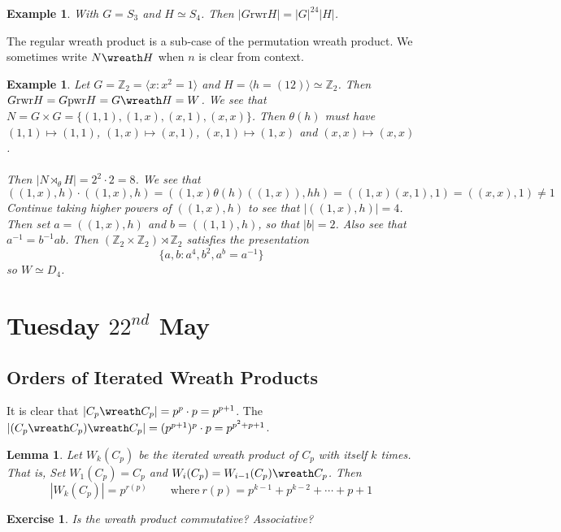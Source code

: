 \documentclass[a4paper,10pt]{article}
\newcommand{\ZZ}{\mathbb{Z}}
\newtheorem{eg}[thm]{Example}
\newtheorem{Ex}[thm]{Exercise}
\newtheorem{Lem}[thm]{Lemma}
\begin{document}
\begin{eg}
With $G = S_3$ and $H \simeq S_4$. Then $|G \text{rwr} H | = |G|^{24} |H|$. 
\end{eg}


The regular wreath product is a sub-case of the permutation wreath product. We sometimes write $N \wreath H$ when $n$ is clear from context. 

\begin{eg}
Let $G = \ZZ_2 = \langle x : x^2 =1 \rangle$ and $H = \langle h = (12) \rangle \simeq \ZZ_2$. Then $G \text{rwr} H = G \text{pwr} H = G \wreath H = W$. We see that $N = G \times G = \{ (1,1) , (1,x), (x,1), (x,x) \}$. Then $\theta(h)$ must have $(1,1) \mapsto (1,1)$, $(1,x) \mapsto (x,1)$, $(x,1) \mapsto (1,x)$ and $(x,x) \mapsto (x,x)$. \\
\\
Then $|N \rtimes_\theta H| = 2^2 \cdot 2 =8$. We see that
\[ ( (1,x), h) \cdot ((1,x), h) = ((1,x) \theta(h) ((1,x)), hh) = ((1,x)(x,1), 1 ) = ((x,x),1) \neq 1 \]
Continue taking higher powers of $((1,x),h)$ to see that $|((1,x), h)| = 4$. Then set $a = ((1,x),h)$ and $b = ((1,1),h)$, so that $|b| = 2$. Also see that $a^{-1} = b^{-1} ab$. Then $(\ZZ_2 \times \ZZ_2) \rtimes \ZZ_2$ satisfies the presentation
\[ \{ a,b : a^4, b^2, a^b = a^{-1} \} \]
so $W \simeq D_4$. 
\end{eg}


\newpage
\section{Tuesday $22^{nd}$ May}


\subsection{Orders of Iterated Wreath Products}

It is clear that $| C_p \wreath C_p | = p^p \cdot p = p^{p+1}$. The $| (C_p \wreath C_p) \wreath C_p | = (p^{p+1})^p \cdot p = p^{p^2 + p + 1}$.


\begin{Lem}
Let $W_k (C_p) $ be the iterated wreath product of $C_p$ with itself $k$ times. That is, Set $W_1(C_p) = C_p$ and $W_i (C_p) = W_{i-1} (C_p)\wreath C_p$. Then 
\[ |W_k (C_p)| = p^{r(p)} \qquad \text{where} \ r(p) = p^{k-1} + p^{k-2} + \cdots + p + 1 \]
\end{Lem}

\begin{Ex}
Is the wreath product commutative? Associative?
\end{Ex}
\end{document}
